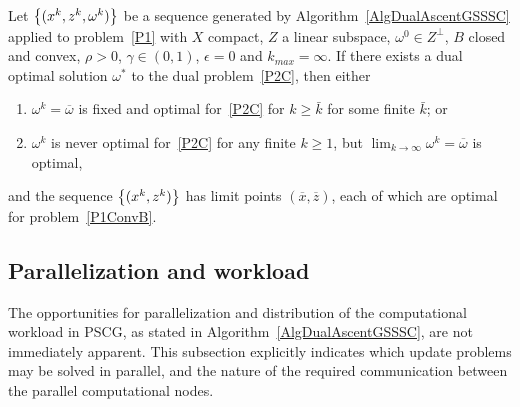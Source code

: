 \begin{proposition}\label{PropFWBCD}
Let $\left\{ (x^k,z^k,\omega^k) \right \}$ be a sequence generated by Algorithm~\ref{AlgDualAscentGSSSC} applied to problem~\eqref{P1} with $X$ compact, $Z$ a linear subspace, $\omega^0 \in Z^{\perp}$, $B$ closed and convex, $\rho > 0$, $\gamma \in (0,1)$, $\epsilon=0$ and $k_{max}=\infty$. 
If there exists a dual optimal solution $\omega^*$ to the dual problem~\eqref{P2C}, then either
\begin{enumerate}
\item $\omega^k = \overline{\omega}$ is fixed and optimal for~\eqref{P2C} for $k \ge \bar{k}$ for some finite $\bar{k}$; or
\item $\omega^k$ is never optimal for~\eqref{P2C} for any finite $k \ge 1$, but $\lim_{k \to \infty} \omega^k = \overline{\omega}$ is optimal,
\end{enumerate}
and the sequence $\left\{ (x^k,z^k) \right \}$ has limit points $(\overline{x},\overline{z})$, each of which are optimal for problem~\eqref{P1ConvB}.
\end{proposition}


\subsection{Parallelization and workload}
The opportunities for parallelization and distribution of the computational workload in PSCG, as stated in Algorithm~\ref{AlgDualAscentGSSSC}, are not immediately apparent.
This subsection explicitly indicates which update problems may be solved in parallel, and the nature of the required communication between the parallel computational nodes.

